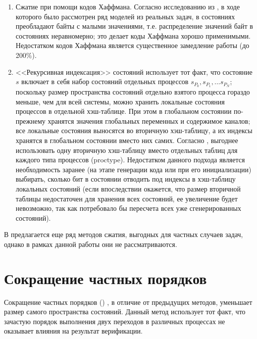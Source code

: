 \begin{enumerate}
\item Сжатие при помощи кодов Хаффмана. Согласно исследованию из
  \cite{StateCompr}, в ходе которого было рассмотрен ряд моделей из
  реальных задач, в состояниях преобладают байты с малыми значениями,
  т.е. распределение значений байт в состояниях неравномерно; это
  делает коды Хаффмана хорошо применимыми. Недостатком кодов Хаффмана
  является существенное замедление работы (до 200\%).

\item <<Рекурсивная индексация>> состояний использует тот факт, что
  состояние $s$ включает в себя набор состояний отдельных процессов
  $s_P_0, s_P_1, ... s_P_N$; поскольку размер пространства состояний
  отдельно взятого процесса гораздо меньше, чем для всей системы,
  можно хранить локальные состояния процессов в отдельной
  хэш-таблице. При этом в глобальном состоянии по-прежнему хранятся
  значения глобальных переменных и содержимое каналов; все локальные
  состояния выносятся во вторичную хэш-таблицу, а их индексы хранятся
  в глобальном состоянии вместо них самих. Согласно \cite{StateCompr},
  выгоднее использовать одну вторичную хэш-таблицу вместо отдельных
  таблиц для каждого типа процессов (proctype). Недостатком данного
  подхода является необходимость заранее (на этапе генерации кода или
  при его инициализации) выбирать, сколько бит в состоянии отводить
  под индексы в хэш-таблицу локальных состояний (если впоследствии
  окажется, что размер вторичной таблицы недостаточен для хранения
  всех состояний, ее увеличение будет невозможно, так как потребовало
  бы пересчета всех уже сгенерированных состояний).
\end{enumerate}

В \cite{StateCompr} предлагается еще ряд методов сжатия, выгодных для
частных случаев задач, однако в рамках данной работы они не
рассматриваются. 

\section{Сокращение частных порядков}
\label{sec:partial-order-reduction}

Сокращение частных порядков () \cite{POD}, в
отличие от предыдущих методов, уменьшает размер самого пространства
состояний. Данный метод использует тот факт, что зачастую порядок
выполнения двух переходов в различных процессах не оказывает влияния
на результат верификации. 

